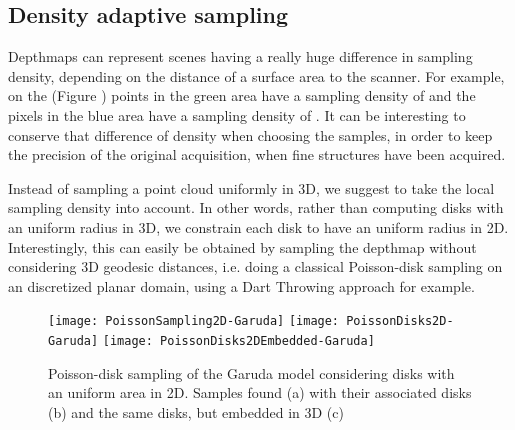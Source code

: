 \subsection{Density adaptive sampling}
Depthmaps can represent scenes having a really huge difference in sampling density, depending on the distance of a surface area to the scanner. 
For example, on the (Figure ) points in the green area have a sampling density of  and the pixels in the blue area have a sampling density of . It can be interesting to conserve that difference of density when choosing the samples, in order to keep the precision of the original acquisition, when fine structures have been acquired.

Instead of sampling a point cloud uniformly in 3D, we suggest to take the local sampling density into account. In other words, rather than computing disks with an uniform radius in 3D, we constrain each disk to have an uniform radius in 2D.
Interestingly, this can easily be obtained by sampling the depthmap without considering 3D geodesic distances, i.e. doing a classical Poisson-disk sampling on an discretized planar domain, using a Dart Throwing approach for example.

\begin{figure}[ht]
\centering
\texttt{[image: PoissonSampling2D-Garuda]}
\texttt{[image: PoissonDisks2D-Garuda]}
\texttt{[image: PoissonDisks2DEmbedded-Garuda]}
\caption{Poisson-disk sampling of the Garuda model considering disks with an uniform area in 2D. Samples found (a) with their associated disks (b) and the same disks, but embedded in 3D (c)}
\label{fig:poisson_sampling_2d}
\end{figure}


